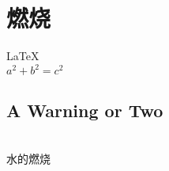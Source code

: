 \documentclass[UTF8]{article}
\begin{document}
       
 
\section{燃烧}          
\LaTeX \,\\ 
 $a^2+b^2=c^2$\\
 

\subsection{A Warning or Two}  

\\
水的燃烧
\end{document}
